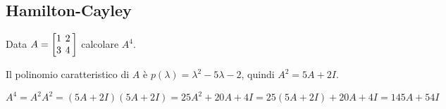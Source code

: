 \subsection{Hamilton-Cayley}

Data $A = \left[
\arraycolsep=2.0pt\def\arraystretch{1.0}
\begin{array}{@{}ccc@{}}
1 & 2 \\
3 & 4 \\
\end{array}
\right]$ calcolare $A^4$.

Il polinomio caratteristico di $A$ è $p(\lambda) = \lambda^2-5\lambda-2$, quindi $A^2=5A+2I$.

$A^4 = A^2A^2 = (5A+2I)(5A+2I) = 25A^2+20A+4I = 25(5A+2I)+20A+4I = 145A + 54I$